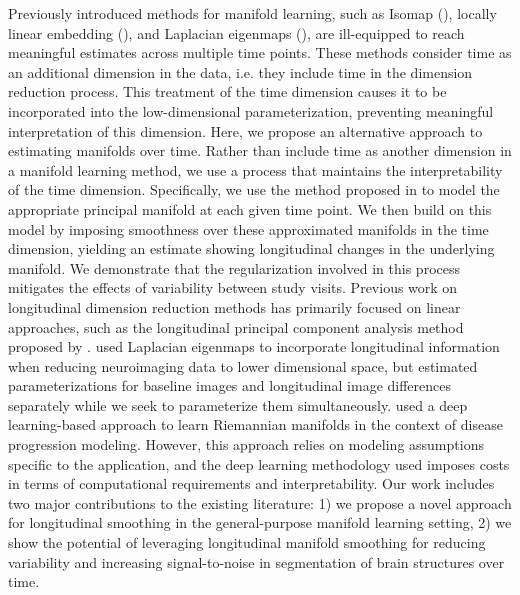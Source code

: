 \documentclass[11pt,reqno]{article}
\theoremstyle{definition}
\begin{document}
Previously introduced methods for manifold learning, such as Isomap (\cite{tenenbaumGlobalGeometricFramework2000}), locally linear embedding (\cite{roweisNonlinearDimensionalityReduction2000}), and Laplacian eigenmaps (\cite{belkin2003laplacian}), are ill-equipped to reach meaningful estimates across multiple time points. These methods consider time as an additional dimension in the data, i.e. they include time in the dimension reduction process. This treatment of the time dimension causes it to be incorporated into the low-dimensional parameterization, preventing meaningful interpretation of this dimension. Here, we propose an alternative approach to estimating manifolds over time. Rather than include time as another dimension in a manifold learning method, we use a process that maintains the interpretability of the time dimension. Specifically, we use the method proposed in \cite{mengPrincipalManifoldEstimation2021} to model the appropriate principal manifold at each given time point. We then build on this model by imposing smoothness over these approximated manifolds in the time dimension, yielding an estimate showing longitudinal changes in the underlying manifold. We demonstrate that the regularization involved in this process mitigates the effects of variability between study visits. Previous work on longitudinal dimension reduction methods has primarily focused on linear approaches, such as the longitudinal principal component analysis method proposed by \cite{kinsonLongitudinalPrincipalComponent2020}. \cite{wolzManifoldLearningBiomarker2010a} used Laplacian eigenmaps to incorporate longitudinal information when reducing neuroimaging data to lower dimensional space, but estimated parameterizations for baseline images and longitudinal image differences separately while we seek to parameterize them simultaneously. \cite{louisRiemannianGeometryLearning2019} used a deep learning-based approach to learn Riemannian manifolds in the context of disease progression modeling. However, this approach relies on modeling assumptions specific to the application, and the deep learning methodology used imposes costs in terms of computational requirements and interpretability. Our work includes two major contributions to the existing literature: 1) we propose a novel approach for longitudinal smoothing in the general-purpose manifold learning setting, 2) we show the potential of leveraging longitudinal manifold smoothing for reducing variability and increasing signal-to-noise in segmentation of brain structures over time.
\end{document}
